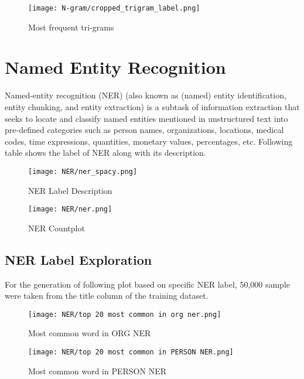 \begin{figure}[H]
    \centering
    \texttt{[image: N-gram/cropped\_trigram\_label.png]}
    \caption{Most frequent tri-grams}
    \label{fig:Most frequent tri-grams}
\end{figure}



\section{Named Entity Recognition}
Named-entity recognition (NER) (also known as (named) entity identification, entity chunking, and entity extraction) is a subtask of information extraction that seeks to locate and classify named entities mentioned in unstructured text into pre-defined categories such as person names, organizations, locations, medical codes, time expressions, quantities, monetary values, percentages, etc. Following table shows the label of NER along with its description.


\begin{figure}[H]
    \centering
    \texttt{[image: NER/ner\_spacy.png]}
    \caption{NER Label Description}
    \label{fig:NER Label Description}
\end{figure}

\begin{figure}[H]
    \centering
    \texttt{[image: NER/ner.png]}
    \caption{NER Countplot}
    \label{fig:NER Countplot}
\end{figure}

\subsection{NER Label Exploration}
For the generation of following plot based on specific NER label, 50,000 sample were taken from the title column of the training dataset.

\begin{figure}[H]
    \centering
    \texttt{[image: NER/top 20 most common in org ner.png]}
    \caption{Most common word in ORG NER}
    \label{fig:Most common word in ORG NER}
\end{figure}

\begin{figure}[H]
    \centering
    \texttt{[image: NER/top 20 most common in PERSON NER.png]}
    \caption{Most common word in PERSON NER}
    \label{fig:Most common word in PERSON NER}
\end{figure}

